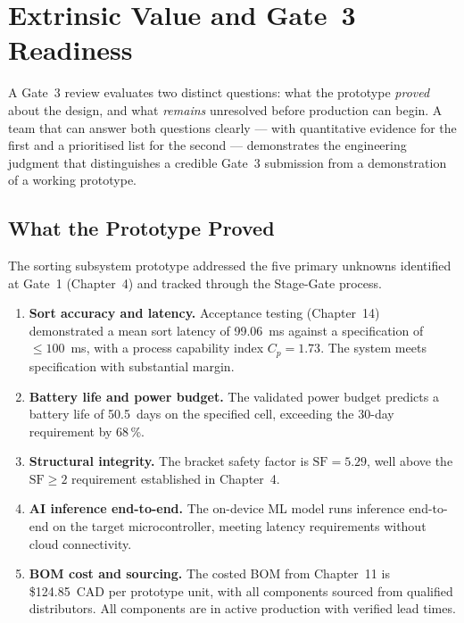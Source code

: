 \section{Extrinsic Value and Gate~3 Readiness}
\label{sec:ch17-gate3}

A Gate~3 review evaluates two distinct questions: what the prototype
\emph{proved} about the design, and what \emph{remains} unresolved before
production can begin.
A team that can answer both questions clearly --- with quantitative evidence
for the first and a prioritised list for the second --- demonstrates the
engineering judgment that distinguishes a credible Gate~3 submission from a
demonstration of a working prototype.

\subsection{What the Prototype Proved}
\label{sec:ch17-proved}

The sorting subsystem prototype addressed the five primary unknowns
identified at Gate~1 (Chapter~4) and tracked through the Stage-Gate
process.

\begin{enumerate}
  \item \textbf{Sort accuracy and latency.}
        Acceptance testing (Chapter~14) demonstrated a mean sort latency of
        99.06~ms against a specification of $\leq 100$~ms, with a process
        capability index $C_p = 1.73$.
        The system meets specification with substantial margin.

  \item \textbf{Battery life and power budget.}
        The validated power budget predicts a battery life of 50.5~days
        on the specified cell, exceeding the 30-day requirement by 68\,\%.

  \item \textbf{Structural integrity.}
        The bracket safety factor is $\text{SF} = 5.29$, well above the
        $\text{SF} \geq 2$ requirement established in Chapter~4.

  \item \textbf{AI inference end-to-end.}
        The on-device ML model runs inference end-to-end on the target
        microcontroller, meeting latency requirements without cloud
        connectivity.

  \item \textbf{BOM cost and sourcing.}
        The costed BOM from Chapter~11 is \$124.85~CAD per prototype unit,
        with all components sourced from qualified distributors.
        All components are in active production with verified lead times.
\end{enumerate}

